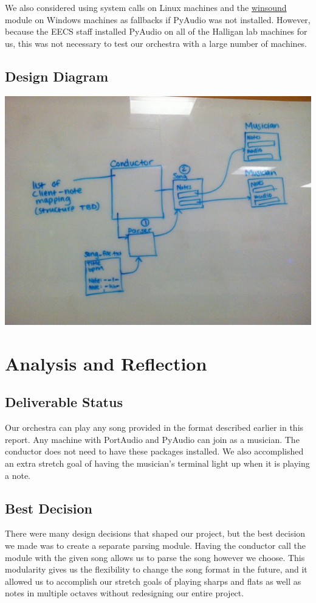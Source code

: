 \documentclass[12pt, letterpaper]{article}
\begin{document}
We also considered using system calls on Linux machines and the
\href{https://docs.python.org/2/library/winsound.html}{winsound} module on Windows machines as
fallbacks if PyAudio was not installed. However, because the EECS staff installed PyAudio on all of
the Halligan lab machines for us, this was not necessary to test our orchestra with a large number
of machines.


\subsection{Design Diagram}
\includegraphics[width=\textwidth]{old_diagram}


\section{Analysis and Reflection}

\subsection{Deliverable Status}
Our orchestra can play any song provided in the format described earlier in this report. Any machine
with PortAudio and PyAudio can join as a musician. The conductor does not need to have these
packages installed. We also accomplished an extra stretch goal of having the musician's terminal
light up when it is playing a note.

\subsection{Best Decision}
There were many design decisions that shaped our project, but the best decision we made was to
create a separate parsing module. Having the conductor call the module with the given song allows
us to parse the song however we choose. This modularity gives us the flexibility to change the
song format in the future, and it allowed us to accomplish our stretch goals of playing sharps and
flats as well as notes in multiple octaves without redesigning our entire project.
\end{document}
